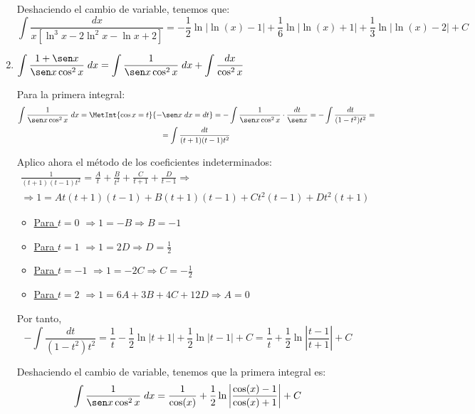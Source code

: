 \begin{ejercicio}
\begin{enumerate}
   Deshaciendo el cambio de variable, tenemos que:
   \begin{equation*}
       \int \frac{dx}{x[\ln^3 x-2\ln^2x-\ln x+2]}
       = -\frac{1}{2}\ln|\ln (x)-1|+\frac{1}{6}\ln|\ln (x)+1|+\frac{1}{3}\ln|\ln (x)-2|+C 
   \end{equation*}

   \item $\displaystyle \int \frac{1+\sen x}{\sen x \cos^2 x}\;dx
   = \int \frac{1}{\sen x \cos^2 x}\;dx+\int \frac{dx}{\cos^2 x}$

   Para la primera integral:
   \begin{multline*}
       \int \frac{1}{\sen x \cos^2 x}\;dx = \MetInt{\cos x =t}{-\sen x\;dx = dt}
       = -\int \frac{1}{\sen x \cos^2 x}\cdot \frac{dt}{\sen x}
       = -\int \frac{dt}{(1-t^2)t^2}
       =\\=
       \int \frac{dt}{(t+1)(t-1)t^2}
   \end{multline*}

   Aplico ahora el método de los coeficientes indeterminados:
   \begin{multline*}
       \frac{1}{(t+1)(t-1)t^2} = \frac{A}{t}+\frac{B}{t^2}+\frac{C}{t+1}+\frac{D}{t-1}
       \Longrightarrow \\ \Longrightarrow
       1= At(t+1)(t-1) + B(t+1)(t-1)+Ct^2(t-1)+Dt^2(t+1)
   \end{multline*}
   \begin{itemize}
       \item \underline{Para $t=0$} $\Longrightarrow 1=-B\Longrightarrow B=-1$
       \item \underline{Para $t=1$} $\Longrightarrow 1=2D\Longrightarrow D=\frac{1}{2}$
       \item \underline{Para $t=-1$} $\Longrightarrow 1=-2C\Longrightarrow C=-\frac{1}{2}$
       \item \underline{Para $t=2$} $\Longrightarrow 1=6A+3B+4C+12D\Longrightarrow A=0$
   \end{itemize}

   Por tanto,
   \begin{equation*}
       -\int \frac{dt}{(1-t^2)t^2} = \frac{1}{t} -\frac{1}{2}\ln|t+1|+\frac{1}{2}\ln|t-1| +C = \frac{1}{t}+\frac{1}{2}\ln \left|\frac{t-1}{t+1}\right|+C
   \end{equation*}

   Deshaciendo el cambio de variable, tenemos que la primera integral es:
   \begin{equation*}
       \int \frac{1}{\sen x \cos^2 x}\;dx
       = \frac{1}{\cos (x)}+\frac{1}{2}\ln \left|\frac{\cos (x)-1}{\cos (x)+1}\right|+C
   \end{equation*}


\end{enumerate}
\end{ejercicio}
